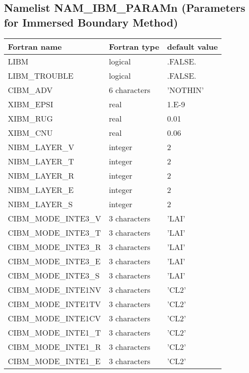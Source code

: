 \subsection{Namelist NAM\_IBM\_PARAMn (Parameters for Immersed Boundary Method)}
\begin{longtable} {|p{}|p{}|p{}|}
\hline
Fortran name &  Fortran type & default value \\
\hline 
\endhead
\hline
\endfoot
LIBM                 & logical       & .FALSE.       \\
LIBM\_TROUBLE        & logical       & .FALSE.       \\
CIBM\_ADV            & 6 characters  & 'NOTHIN'      \\
XIBM\_EPSI           & real          & 1.E-9         \\
XIBM\_RUG            & real          & 0.01          \\
XIBM\_CNU            & real          & 0.06          \\\hline
NIBM\_LAYER\_V       & integer       & 2             \\
NIBM\_LAYER\_T       & integer       & 2             \\
NIBM\_LAYER\_R       & integer       & 2             \\
NIBM\_LAYER\_E       & integer       & 2             \\\hline
NIBM\_LAYER\_S       & integer       & 2             \\
CIBM\_MODE\_INTE3\_V & 3 characters  & 'LAI'         \\
CIBM\_MODE\_INTE3\_T & 3 characters  & 'LAI'         \\
CIBM\_MODE\_INTE3\_R & 3 characters  & 'LAI'         \\
CIBM\_MODE\_INTE3\_E & 3 characters  & 'LAI'         \\
CIBM\_MODE\_INTE3\_S & 3 characters  & 'LAI'         \\\hline
CIBM\_MODE\_INTE1NV  & 3 characters  & 'CL2'         \\
CIBM\_MODE\_INTE1TV  & 3 characters  & 'CL2'         \\
CIBM\_MODE\_INTE1CV  & 3 characters  & 'CL2'         \\
CIBM\_MODE\_INTE1\_T & 3 characters  & 'CL2'         \\
CIBM\_MODE\_INTE1\_R & 3 characters  & 'CL2'         \\
CIBM\_MODE\_INTE1\_E & 3 characters  & 'CL2'         \\

\end{longtable}
